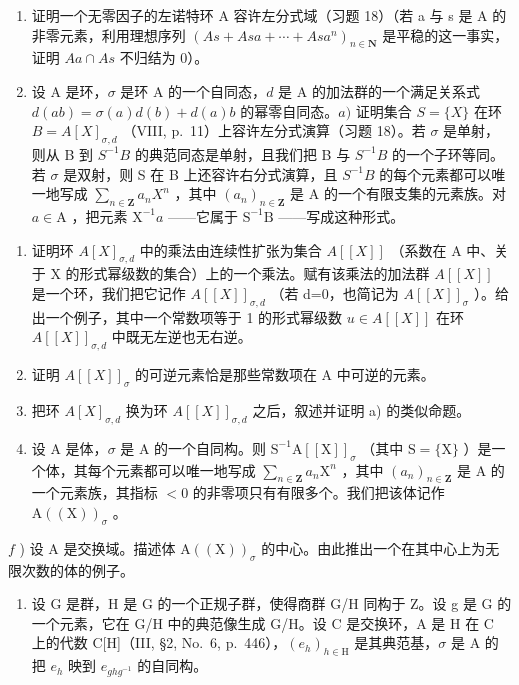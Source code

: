\begin{enumerate}
\def\labelenumi{\arabic{enumi})}
\setcounter{enumi}{19}
\item
  证明一个无零因子的左诺特环 A 容许左分式域（习题 18）（若 a 与 s 是 A 的非零元素，利用理想序列 \((As + Asa + \cdots + Asa^{n})_{n \in \mathbf{N}}\) 是平稳的这一事实，证明 \(Aa \cap As\) 不归结为 0）。
\item
  设 A 是环，\(\sigma\) 是环 A 的一个自同态，\(d\) 是 A 的加法群的一个满足关系式 \(d(ab) = \sigma(a)d(b) + d(a)b\) 的幂零自同态。\(a)\) 证明集合 \(S = \{X\}\) 在环 \(B = A[X]_{\sigma,d}\) （VIII, p.~11）上容许左分式演算（习题 18）。若 \(\sigma\) 是单射，则从 B 到 \(S^{-1}B\) 的典范同态是单射，且我们把 B 与 \(S^{-1}B\) 的一个子环等同。若 \(\sigma\) 是双射，则 S 在 B 上还容许右分式演算，且 \(S^{-1}B\) 的每个元素都可以唯一地写成 \(\sum_{n\in\mathbf{Z}}a_nX^n\) ，其中 \((a_n)_{n\in\mathbf{Z}}\) 是 A 的一个有限支集的元素族。对 \(a \in \mathrm{A}\) ，把元素 \(\mathrm{X}^{-1}a\) ——它属于 \(\mathrm{S}^{-1}\mathrm{B}\) ——写成这种形式。
\end{enumerate}

\begin{enumerate}
\def\labelenumi{\alph{enumi})}
\setcounter{enumi}{1}
\item
  证明环 \(A[X]_{\sigma,d}\) 中的乘法由连续性扩张为集合 \(A[[X]]\) （系数在 A 中、关于 X 的形式幂级数的集合）上的一个乘法。赋有该乘法的加法群 \(A[[X]]\) 是一个环，我们把它记作 \(A[[X]]_{\sigma,d}\) （若 d=0，也简记为 \(A[[X]]_{\sigma}\) ）。给出一个例子，其中一个常数项等于 1 的形式幂级数 \(u\in A[[X]]\) 在环 \(A[[X]]_{\sigma,d}\) 中既无左逆也无右逆。
\item
  证明 \(A[[X]]_{\sigma}\) 的可逆元素恰是那些常数项在 A 中可逆的元素。
\item
  把环 \(A[X]_{\sigma,d}\) 换为环 \(A[[X]]_{\sigma,d}\) 之后，叙述并证明 a) 的类似命题。
\item
  设 A 是体，\(\sigma\) 是 A 的一个自同构。则 \(\mathrm{S}^{-1}\mathrm{A}[[\mathrm{X}]]_{\sigma}\) （其中 \(\mathrm{S} = \{\mathrm{X}\}\) ）是一个体，其每个元素都可以唯一地写成 \(\sum_{n\in \mathbf{Z}}a_n\mathrm{X}^n\) ，其中 \((a_{n})_{n\in \mathbf{Z}}\) 是 A 的一个元素族，其指标 \(< 0\) 的非零项只有有限多个。我们把该体记作 \(\mathrm{A}((\mathrm{X}))_{\sigma}\) 。
\end{enumerate}

\(f\) ) 设 A 是交换域。描述体 \(\mathrm{A}((\mathrm{X}))_{\sigma}\) 的中心。由此推出一个在其中心上为无限次数的体的例子。

\begin{enumerate}
\def\labelenumi{\arabic{enumi})}
\setcounter{enumi}{21}
\tightlist
\item
  设 G 是群，H 是 G 的一个正规子群，使得商群 G/H 同构于 Z。设 g 是 G 的一个元素，它在 G/H 中的典范像生成 G/H。设 C 是交换环，A 是 H 在 C 上的代数 C{[}H{]}（III, §2, No.~6, p.~446），\((e_{h})_{h\in\mathrm{H}}\) 是其典范基，\(\sigma\) 是 A 的把 \(e_{h}\) 映到 \(e_{ghg^{-1}}\) 的自同构。
\end{enumerate}

